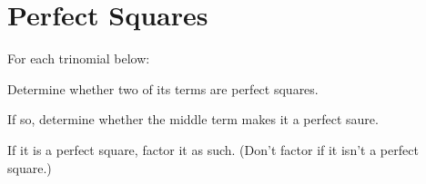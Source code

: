 \section*{Perfect Squares}
For each trinomial below:
\begin{clist}
\item Determine whether two of its terms are perfect squares.
\item If so, determine whether the middle term makes it a perfect saure.
\item If it is a perfect square, factor it as such. (Don't factor if it isn't a perfect square.)
\end{clist}
\begin{senum}
\item{}
\item{}
\item{}
\item{}
\item{}
\item{}
\item{}
\item{}
\end{senum}

